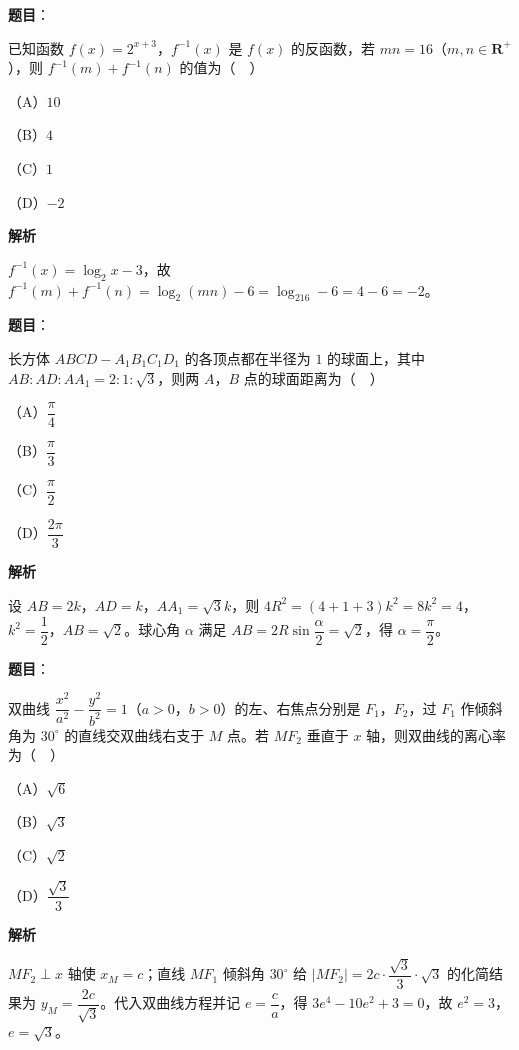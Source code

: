 \begin{answer}

\textbf{题目}：

已知函数 $f(x)=2^{x+3}$，$f^{-1}(x)$ 是 $f(x)$ 的反函数，若 $mn=16$（$m,n\in\mathbf R^+$），则 $f^{-1}(m)+f^{-1}(n)$ 的值为（　）

（A）$10$

（B）$4$

（C）$1$

（D）$-2$

\textbf{解析}

$f^{-1}(x)=\log_2x-3$，故 $f^{-1}(m)+f^{-1}(n)=\log_2(mn)-6=\log_216-6=4-6=-2$。


\end{answer}
\begin{answer}

\textbf{题目}：

长方体 $ABCD-A_1B_1C_1D_1$ 的各顶点都在半径为 $1$ 的球面上，其中 $AB:AD:AA_1=2:1:\sqrt3$，则两 $A$，$B$ 点的球面距离为（　）

（A）$\dfrac{\pi}4$

（B）$\dfrac{\pi}3$

（C）$\dfrac{\pi}2$

（D）$\dfrac{2\pi}3$

\textbf{解析}

设 $AB=2k$，$AD=k$，$AA_1=\sqrt3k$，则 $4R^2=(4+1+3)k^2=8k^2=4$，$k^2=\dfrac12$，$AB=\sqrt2$。球心角 $\alpha$ 满足 $AB=2R\sin\dfrac\alpha2=\sqrt2$，得 $\alpha=\dfrac{\pi}2$。


\end{answer}
\begin{answer}

\textbf{题目}：

双曲线 $\dfrac{x^2}{a^2}-\dfrac{y^2}{b^2}=1$（$a>0$，$b>0$）的左、右焦点分别是 $F_1$，$F_2$，过 $F_1$ 作倾斜角为 $30^\circ$ 的直线交双曲线右支于 $M$ 点。若 $MF_2$ 垂直于 $x$ 轴，则双曲线的离心率为（　）

（A）$\sqrt6$

（B）$\sqrt3$

（C）$\sqrt2$

（D）$\dfrac{\sqrt3}3$

\textbf{解析}

$MF_2\perp x$ 轴使 $x_M=c$；直线 $MF_1$ 倾斜角 $30^\circ$ 给 $|MF_2|=2c\cdot\dfrac{\sqrt3}3\cdot\sqrt3$ 的化简结果为 $y_M=\dfrac{2c}{\sqrt3}$。代入双曲线方程并记 $e=\dfrac ca$，得 $3e^4-10e^2+3=0$，故 $e^2=3$，$e=\sqrt3$。


\end{answer}
